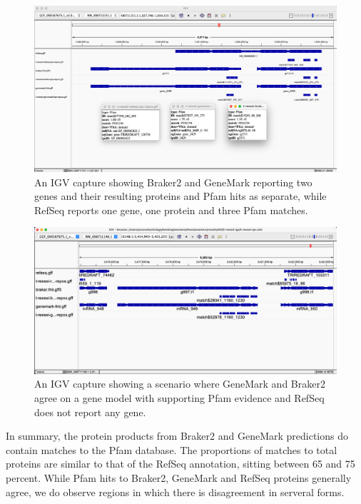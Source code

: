 \begin{figure}[h!]
  \centering
  \includegraphics[width=\textwidth]{figures/igv/ips-model-disagree2.png}
  \caption[Split Pfam matches]{An IGV capture showing Braker2 and
    GeneMark reporting two genes and their resulting proteins and
    Pfam hits as separate, while RefSeq reports one gene, one protein
    and three Pfam matches.}
  \label{fig:agree-bizarre2}
\end{figure}

\begin{figure}
  \centering
  \includegraphics[width=\textwidth]{figures/igv/ips-braker-genemark-norefseq.png}
  \caption[RefSeq absence with IPS evidence]{An IGV capture showing a
    scenario where GeneMark and Braker2 agree on a gene model with
    supporting Pfam evidence and RefSeq does not report any gene.}
  \label{fig:ips-no-refseq}
\end{figure}

In summary, the protein products from Braker2 and GeneMark predictions
do contain matches to the Pfam database. The proportions of matches to
total proteins are similar to that of the RefSeq annotation, sitting
between 65 and 75 percent. While Pfam hits to Braker2, GeneMark and
RefSeq proteins generally agree, we do observe regions in which there
is disagreement in serveral forms.
